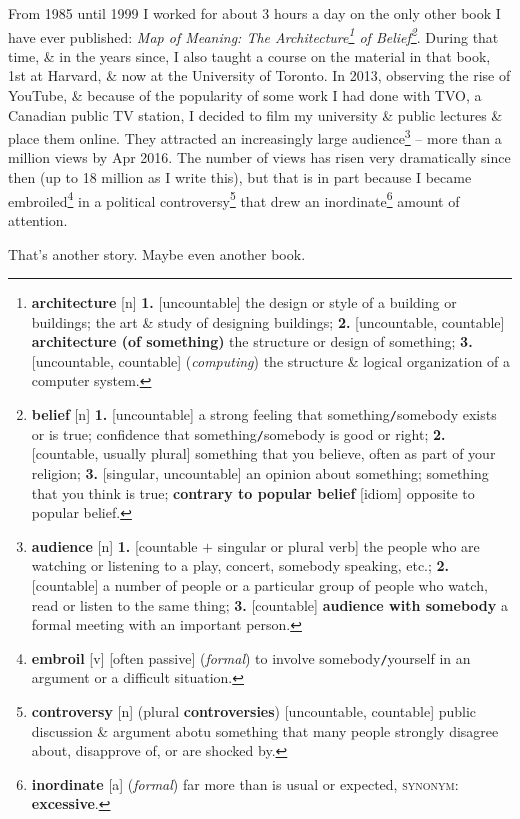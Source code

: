 \documentclass[oneside]{book}
\numberwithin{equation}{section}
\begin{document}
From 1985 until 1999 I worked for about 3 hours a day on the only other book I have ever published: \textit{Map of Meaning: The Architecture\footnote{\textbf{architecture} [n] \textbf{1.} [uncountable] the design or style of a building or buildings; the art \& study of designing buildings; \textbf{2.} [uncountable, countable] \textbf{architecture (of something)} the structure or design of something; \textbf{3.} [uncountable, countable] (\textit{computing}) the structure \& logical organization of a computer system.} of Belief\footnote{\textbf{belief} [n] \textbf{1.} [uncountable] a strong feeling that something\texttt{/}somebody exists or is true; confidence that something\texttt{/}somebody is good or right; \textbf{2.} [countable, usually plural] something that you believe, often as part of your religion; \textbf{3.} [singular, uncountable] an opinion about something; something that you think is true; \textbf{contrary to popular belief} [idiom] opposite to popular belief.}}. During that time, \& in the years since, I also taught a course on the material in that book, 1st at Harvard, \& now at the University of Toronto. In 2013, observing the rise of YouTube, \& because of the popularity of some work I had done with TVO, a Canadian public TV station, I decided to film my university \& public lectures \& place them online. They attracted an increasingly large audience\footnote{\textbf{audience} [n] \textbf{1.} [countable $+$ singular or plural verb] the people who are watching or listening to a play, concert, somebody speaking, etc.; \textbf{2.} [countable] a number of people or a particular group of people who watch, read or listen to the same thing; \textbf{3.} [countable] \textbf{audience with somebody} a formal meeting with an important person.} -- more than a million views by Apr 2016. The number of views has risen very dramatically since then (up to 18 million as I write this), but that is in part because I became embroiled\footnote{\textbf{embroil} [v] [often passive] (\textit{formal}) to involve somebody\texttt{/}yourself in an argument or a difficult situation.} in a political controversy\footnote{\textbf{controversy} [n] (plural \textbf{controversies}) [uncountable, countable] public discussion \& argument abotu something that many people strongly disagree about, disapprove of, or are shocked by.} that drew an inordinate\footnote{\textbf{inordinate} [a] (\textit{formal}) far more than is usual or expected, \textsc{synonym}: \textbf{excessive}.} amount of attention.

That's another story. Maybe even another book.
\end{document}
